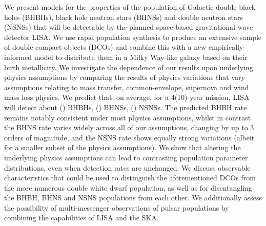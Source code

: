 We present models for the properties of the population of Galactic double black holes (BHBHs), black hole neutron stars (BHNSs) and double neutron stars (NSNSs) that will be detectable by the planned space-based gravitational wave detector LISA. We use rapid population synthesis to produce an extensive sample of double compact objects (DCOs) and combine this with a new empirically-informed model to distribute them in a Milky Way-like galaxy based on their birth metallicity. We investigate the dependence of our results upon underlying physics assumptions by comparing the results of \nModels{} physics variations that vary assumptions relating to mass transfer, common-envelope, supernova and wind mass loss physics. We predict that, on average, for a 4(10)-year mission, LISA will detect about \BHBHFourYear{}(\BHBHTenYear{}) BHBHs, \BHNSFourYear{}(\BHNSTenYear{}) BHNSs, \NSNSFourYear{}(\NSNSTenYear{}) NSNSs. The predicted BHBH rate remains notably consistent under most physics assumptions, whilst in contrast the BHNS rate varies widely across all of our assumptions, changing by up to 3 orders of magnitude, and the NSNS rate shows equally strong variations (albeit for a smaller subset of the physics assumptions). We show that altering the underlying physics assumptions can lead to contrasting population parameter distributions, even when detection rates are unchanged. We discuss observable characteristics that could be used to distinguish the aforementioned DCOs from the more numerous double white dwarf population, as well as for disentangling the BHBH, BHNS and NSNS populations from each other. We additionally assess the possibility of multi-messenger observations of pulsar populations by combining the capabilities of LISA and the SKA. 